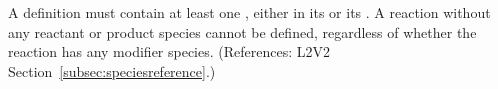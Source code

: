 A \Reaction definition must contain at least one \SpeciesReference, either
in its  or its .  A reaction
without any reactant or product species cannot be defined, regardless of
whether the reaction has any modifier species.  (References: L2V2
Section~\ref{subsec:speciesreference}.)
